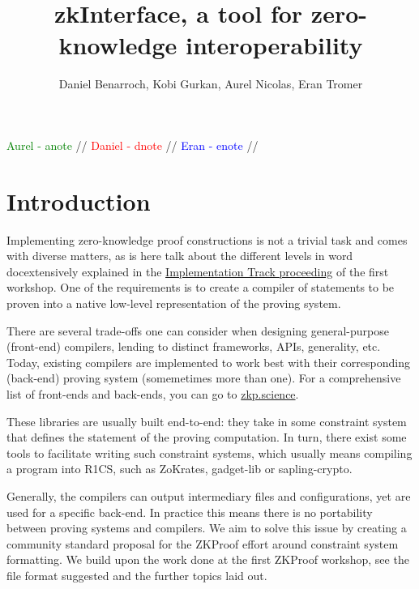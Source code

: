 \documentclass[a4paper,11pt]{article}
\title{zkInterface, a tool for zero-knowledge interoperability}
\author{Daniel Benarroch, Kobi Gurkan, Aurel Nicolas, Eran Tromer}
\newcommand\dnote[1]{\textcolor{red}{#1}}
\newcommand\enote[1]{\textcolor{blue}{#1}}
\newcommand\anote[1]{\textcolor{green}{#1}}
\begin{document}
		
		\maketitle
		
			
		
		
		\anote{Aurel - anote} //
		\dnote{Daniel - dnote} //
		\enote{Eran - enote} //

		\todototoc
		\listoftodos

		\section{Introduction}
		Implementing zero-knowledge proof constructions is not a trivial task and comes with diverse matters, as is 	here talk about the different levels in word docextensively explained in the \href{https://zkproof.org/proceedings-snapshots/zkproof-implementation-20180801.pdf}{Implementation Track proceeding} of the first workshop. One of the requirements is to create a compiler of statements to be proven into a native low-level representation of the proving system.
		
		There are several trade-offs one can consider when designing general-purpose (front-end) compilers, lending to distinct frameworks, APIs, generality, etc. Today, existing compilers are implemented to work best with their corresponding (back-end) proving system (somemetimes more than one). For a comprehensive list of front-ends and back-ends, you can go to \href{https://zkp.science}{zkp.science}. 
		
		These libraries are usually built end-to-end: they take in some constraint system that defines the statement of the proving computation. In turn, there exist some tools to facilitate writing such constraint systems, which usually means compiling a program into R1CS, such as ZoKrates, gadget-lib or sapling-crypto.
		
		Generally, the compilers can output intermediary files and configurations, yet are used for a specific back-end. In practice this means there is no portability between proving systems and compilers. We aim to solve this issue by creating a community standard proposal for the ZKProof effort around constraint system formatting. We build upon the work done at the first ZKProof workshop, see the file format suggested and the further topics laid out. 
		
\end{document}
